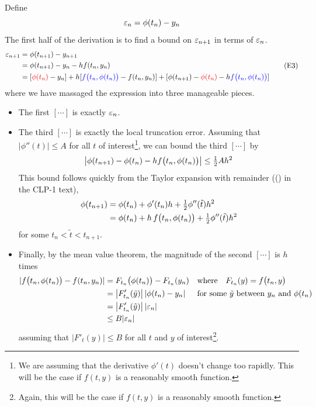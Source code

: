 Define 
\begin{equation*}
\varepsilon_n=\phi(t_n)-y_n
\end{equation*}
The first half of the derivation is to find a bound on $\varepsilon_{n+1}$
in terms of $\varepsilon_n$. 
\begin{equation*}
\begin{split}
\varepsilon_{n+1}&=\phi(t_{n+1})-y_{n+1} \\
&=\phi(t_{n+1})-y_n-hf(t_n,y_n) \\
&=[\textcolor{red}{\phi(t_n)}-y_n]
  +h[\textcolor{blue}{f\big(t_n,\phi(t_n)\big)}-f(t_n,y_n)]
  +[\phi(t_{n+1})-\textcolor{red}{\phi(t_n)}
        -h\textcolor{blue}{f\big(t_n,\phi(t_n)\big)}]
\end{split}
\tag{E3}\end{equation*}
where we have massaged the expression into three manageable pieces.
\begin{itemize}
\item
The first $[\cdots]$ is exactly $\varepsilon_n$. 
\item
The third $[\cdots]$ is exactly the local truncation error. Assuming that $|\phi''(t)|\le A$ for all $t$ of interest\footnote{We are assuming that the derivative $\phi'(t)$ doesn't change too rapidly. This will be the case if $f(t,y)$ is a reasonably smooth function.}, we can bound the third  $[\cdots]$ by
\begin{equation*}
\big|\phi(t_{n+1})-\phi(t_n)-hf\big(t_n,\phi(t_n)\big)\big|\le \tfrac{1}{2} Ah^2
\end{equation*}
This bound follows quickly from the Taylor expansion with remainder 
(() in the CLP-1 text),
\begin{align*}
\phi(t_{n+1})&=\phi(t_n)+\phi'(t_n)h+\tfrac{1}{2} \phi''(\tilde t)h^2 \\
&=\phi(t_n)+h\, f\big(t_n,\phi(t_n)\big)+\tfrac{1}{2} \phi''(\tilde t)h^2
\end{align*}
for some $t_n<\tilde t<t_{n+1}$. 
\item
Finally, by the mean value theorem,
the magnitude of the second $[\cdots]$ is $h$ times
\begin{align*}
|f\big(t_n,\phi(t_n)\big)-f(t_n,y_n)|
&= F_{t_n}\big(\phi(t_n)\big)- F_{t_n}(y_n)
  &&\text{where}\quad F_{t_n}(y) = f\big(t_n,y\big) \\
&=\big|F'_{t_n}(\tilde y)\big| \,|\phi(t_n)-y_n|
   &&\text{for some $\tilde y$ between $y_n$ and $\phi(t_n)$} \\
&=\big|F'_{t_n}(\tilde y)\big| \,|\varepsilon_n|\\
&\le B|\varepsilon_n|
\end{align*}
assuming that $\big|F'_{t}(y)\big|\le B$ for all $t$ and $y$ of 
interest\footnote{Again, this will be the case if $f(t,y)$ is a reasonably smooth function.}. 
\end{itemize}
